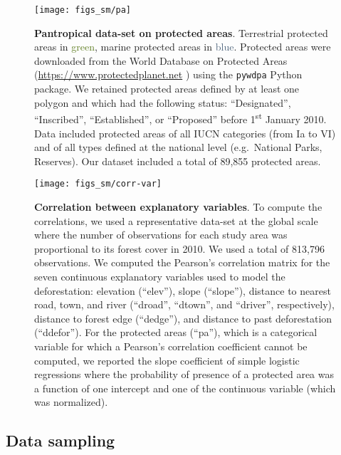 \documentclass[
  12pt,
]{article}
\begin{document}
\begin{figure}[H]

{\centering \texttt{[image: figs\_sm/pa]} 

}

\caption{\textbf{Pantropical data-set on protected areas}. Terrestrial protected areas in \textcolor[HTML]{5c7b1e}{green}, marine protected areas in \textcolor[HTML]{51677e}{blue}. Protected areas were downloaded from the World Database on Protected Areas (\url{https://www.protectedplanet.net} \citep{WDPA2020}) using the \texttt{pywdpa} Python package. We retained protected areas defined by at least one polygon and which had the following status: ``Designated'', ``Inscribed'', ``Established'', or ``Proposed'' before 1\textsuperscript{st} January 2010. Data included protected areas of all IUCN categories (from Ia to VI) and of all types defined at the national level (e.g.~National Parks, Reserves). Our dataset included a total of 89,855 protected areas.}\label{fig:data-pa}
\end{figure}



\begin{figure}[H]

{\centering \texttt{[image: figs\_sm/corr-var]} 

}

\caption{\textbf{Correlation between explanatory variables}. To compute the correlations, we used a representative data-set at the global scale where the number of observations for each study area was proportional to its forest cover in 2010. We used a total of 813,796 observations. We computed the Pearson's correlation matrix for the seven continuous explanatory variables used to model the deforestation: elevation (``elev''), slope (``slope''), distance to nearest road, town, and river (``droad'', ``dtown'', and ``driver'', respectively), distance to forest edge (``dedge''), and distance to past deforestation (``ddefor''). For the protected areas (``pa''), which is a categorical variable for which a Pearson's correlation coefficient cannot be computed, we reported the slope coefficient of simple logistic regressions where the probability of presence of a protected area was a function of one intercept and one of the continuous variable (which was normalized).}\label{fig:corr-var}
\end{figure}

\hypertarget{data-sampling}{%
\subsection{Data sampling}\label{data-sampling}}
\end{document}
